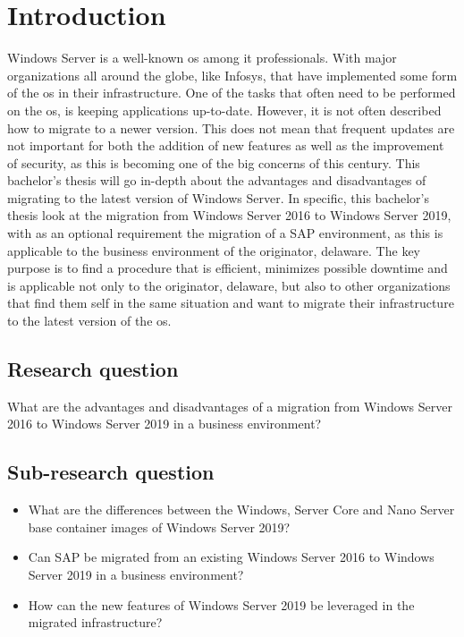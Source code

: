 \section{Introduction}\label{sec:introduction}
Windows Server is a well-known \acrfull{os} among \acrfull{it} professionals. With major organizations all around the globe, like Infosys, that have implemented some form of the \acrshort{os} in their infrastructure. \autocite{S.Chauhan2015}
One of the tasks that often need to be performed on the \acrshort{os}, is keeping applications up-to-date. 
However, it is not often described how to migrate to a newer version.  
This does not mean that frequent updates are not important for both the addition of new features as well as the improvement of security, as this is becoming one of the big concerns of this century. 
This bachelor's thesis will go in-depth about the advantages and disadvantages of migrating to the latest version of Windows Server.
In specific, this bachelor's thesis look at the migration from Windows Server 2016 to Windows Server 2019, with as an optional requirement the migration of a SAP environment, as this is applicable to the business environment of the originator, delaware.
The key purpose is to find a procedure that is efficient, minimizes possible downtime and is applicable not only to the originator, delaware, but also to other organizations that find them self in the same situation and want to migrate their infrastructure to the latest version of the \acrshort{os}.
\subsection{Research question}
What are the advantages and disadvantages of a migration from Windows Server 2016 to Windows Server 2019 in a business environment?
\subsection{Sub-research question}
\begin{itemize}
	\item What are the differences between the Windows, Server Core and Nano Server base container images of Windows Server 2019?
	\item Can SAP be migrated from an existing Windows Server 2016 to Windows Server 2019 in a business environment?
	\item How can the new features of Windows Server 2019 be leveraged in the migrated infrastructure? 
\end{itemize}
